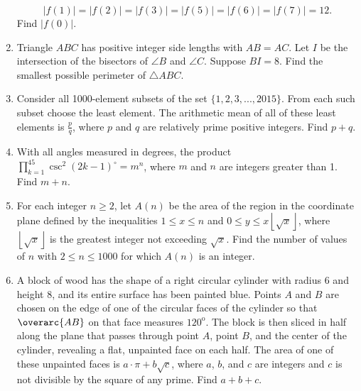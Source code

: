 \documentclass{article}
\begin{document}
\begin{enumerate}[label=\arabic*., itemsep=0.5em]
\begin{equation*}
|f(1)|=|f(2)|=|f(3)|=|f(5)|=|f(6)|=|f(7)|=12.
\end{equation*}
 Find \(|f(0)|\).\par \vspace{0.5em}\item Triangle \(ABC\) has positive integer side lengths with \(AB=AC\). Let \(I\) be the intersection of the bisectors of \(\angle B\) and \(\angle C\). Suppose \(BI=8\). Find the smallest possible perimeter of \(\triangle ABC\).\par \vspace{0.5em}\item Consider all 1000-element subsets of the set \( \{ 1, 2, 3, ... , 2015 \} \).  From each such subset choose the least element.  The arithmetic mean of all of these least elements is \( \frac{p}{q} \), where \(p\) and \(q\) are relatively prime positive integers.  Find \(p + q\).\par \vspace{0.5em}\item With all angles measured in degrees, the product \(\prod_{k=1}^{45} \csc^2(2k-1)^\circ=m^n\), where \(m\) and \(n\) are integers greater than 1. Find \(m+n\).\par \vspace{0.5em}\item For each integer \(n \ge 2\), let \(A(n)\) be the area of the region in the coordinate plane defined by the inequalities \(1\le x \le n\) and \(0\le y \le x \left\lfloor \sqrt x \right\rfloor\), where \(\left\lfloor \sqrt x \right\rfloor\) is the greatest integer not exceeding \(\sqrt x\). Find the number of values of \(n\) with \(2\le n \le 1000\) for which \(A(n)\) is an integer.\par \vspace{0.5em}\item A block of wood has the shape of a right circular cylinder with radius \(6\) and height \(8\), and its entire surface has been painted blue.  Points \(A\) and \(B\) are chosen on the edge of one of the circular faces of the cylinder so that \(\overarc{AB}\) on that face measures \(120^\text{o}\).  The block is then sliced in half along the plane that passes through point \(A\), point \(B\), and the center of the cylinder, revealing a flat, unpainted face on each half.  The area of one of these unpainted faces is \(a\cdot\pi + b\sqrt{c}\), where \(a\), \(b\), and \(c\) are integers and \(c\) is not divisible by the square of any prime.  Find \(a+b+c\).



\end{enumerate}
\end{document}
